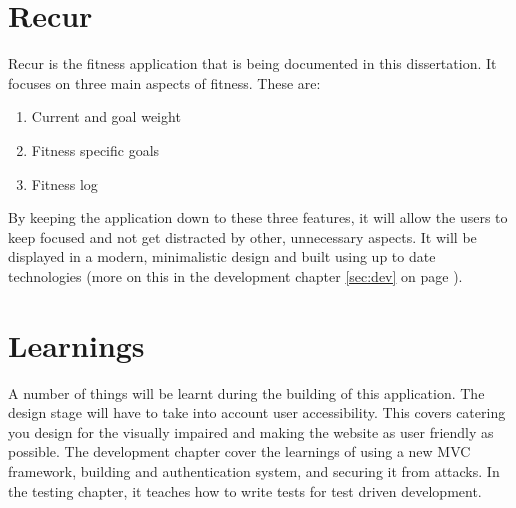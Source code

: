 \section{Recur}
Recur is the fitness application that is being documented in this dissertation. It focuses on three main aspects of fitness. These are:

\begin{enumerate}
\item {Current and goal weight}
\item {Fitness specific goals}
\item {Fitness log}
\end{enumerate}

\noindent
By keeping the application down to these three features, it will allow the users to keep focused and not get distracted by other, unnecessary aspects. It will be displayed in a modern, minimalistic design and built using up to date technologies (more on this in the development chapter \ref{sec:dev} on page \pageref{sec:dev}).\\

\section{Learnings}
A number of things will be learnt during the building of this application. The design stage will have to take into account user accessibility. This covers catering you design for the visually impaired and making the website as user friendly as possible. The development chapter cover the learnings of using a new MVC framework, building and authentication system, and securing it from attacks. In the testing chapter, it teaches how to write tests for test driven development.\\

